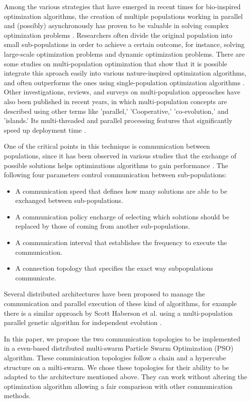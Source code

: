 \documentclass[runningheads]{llncs}
\begin{document}
Among the various strategies that have emerged in recent times for bio-inspired
optimization algorithms, the creation of multiple populations working
in parallel and (possibly) asynchronously has proven to be valuable in 
solving complex optimization problems \cite{a1}.
Researchers often divide the original population into small sub-populations in order to 
achieve a certain outcome, for instance, solving large-scale optimization problems and dynamic
optimization problems. There are some studies on multi-population optimization that show
that it is possible integrate this aproach easily into various nature-inspired optimization algorithms,
and often outperforms the ones using single-population optimization algorithms \cite{b11} \cite{b12}.
Other investigations, reviews, and surveys on multi-population approaches have also
been published in recent years, in which multi-population concepts are described
using other terms like 'parallel,' 'Cooperative,' 'co-evolution,' and 'islands.'
Its multi-threaded and parallel processing features that significantly speed up
deployment time \cite{b13} \cite{b14}.

One of the critical points in this technique is communication between
populations, since it has been observed in various studies that the
exchange of possible solutions helps optimizations algorithms to gain performance \cite{a2}. The following four parameters
control communication between sub-populations:

\begin{itemize}
    \item A communication speed that defines how many solutions are able to be exchanged between sub-populations.
    \item A communication policy encharge of selecting which solutions should be replaced by those of coming from another sub-populations.
    \item A communication interval that establishes the frequency to execute the communication.
    \item A connection topology that specifies the exact way subpopulations communicate.
\end{itemize}

Several distributed architectures have been proposed to manage the communication
and parallel execution of these kind of algorithms, for example there is a
similar approach by Scott Haberson et al. using a multi-population parallel
genetic algorithm for independent evolution \cite{da1}. 

In this paper, we propose the two communication topologies to be implemented in a 
even-based distributed multi-swarm Particle Swarm Optimization (PSO) algorithm.
These comminication topologies follow a chain and a hypercube structure on a milti-swarm. We chose
these topologies for their ability to be adapted to the architecture
mentioned above. They can work without altering the optimization
algorithm allowing a fair comparison with other communication
methods. 
\end{document}
